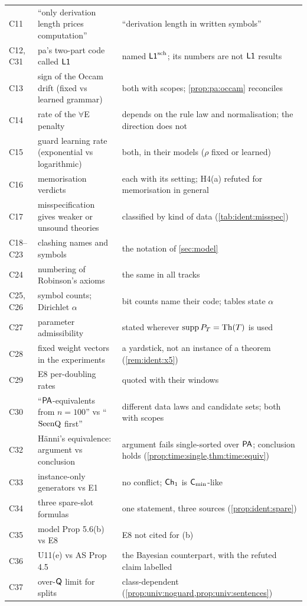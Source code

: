 {\begin{longtable}{@{}l>{\raggedright\arraybackslash}p{6.0cm}>{\raggedright\arraybackslash}p{7.7cm}@{}}
C11 & ``only derivation length prices computation'' & ``derivation length in written symbols''\\
C12, C31 & pa's two-part code called $\mathord{\mathsf{L1}}$ & named $\mathord{\mathsf{L1}}^{\mathrm{sch}}$; its numbers are not $\mathord{\mathsf{L1}}$ results\\
C13 & sign of the Occam drift (fixed vs learned grammar) & both with scopes; \cref{prop:pa:occam} reconciles\\
C14 & rate of the $\forall$E penalty & depends on the rule law and normalisation; the direction does not\\
C15 & guard learning rate (exponential vs logarithmic) & both, in their models ($\rho$ fixed or learned)\\
C16 & memorisation verdicts & each with its setting; H4(a) refuted for memorisation in general\\
C17 & misspecification gives weaker or unsound theories & classified by kind of data (\cref{tab:ident:misspec})\\
C18--C23 & clashing names and symbols & the notation of \cref{sec:model}\\
C24 & numbering of Robinson's axioms & the same in all tracks\\
C25, C26 & symbol counts; Dirichlet $\alpha$ & bit counts name their code; tables state $\alpha$\\
C27 & parameter admissibility & stated wherever $\operatorname{supp}P_T=\mathrm{Th}(T)$ is used\\
C28 & fixed weight vectors in the experiments & a yardstick, not an instance of a theorem (\cref{rem:ident:x5})\\
C29 & E8 per-doubling rates & quoted with their windows\\
C30 & ``$\mathsf{PA}$-equivalents from $n=100$'' vs ``$\mathrm{SeenQ}$ first'' & different data laws and candidate sets; both with scopes\\
C32 & H\"anni's equivalence: argument vs conclusion & argument fails single-sorted over $\mathsf{PA}$; conclusion holds (\cref{prop:time:single,thm:time:equiv})\\
C33 & instance-only generators vs E1 & no conflict; $\mathsf{Ch}_{1}$ is $\mathsf{C}_{\min}$-like\\
C34 & three spare-slot formulas & one statement, three sources (\cref{prop:ident:spare})\\
C35 & model Prop 5.6(b) vs E8 & E8 not cited for (b)\\
C36 & U11(e) vs AS Prop 4.5 & the Bayesian counterpart, with the refuted claim labelled\\
C37 & over-$\mathsf{Q}$ limit for splits & class-dependent (\cref{prop:univ:noguard,prop:univ:sentences})\\

\end{longtable}}

